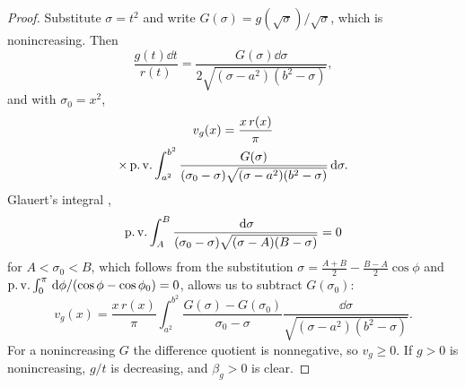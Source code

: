 \begin{proof}
Substitute $\sigma=t^2$ and write $G(\sigma)=g(\sqrt\sigma)/\sqrt\sigma$,
which is nonincreasing. Then
\[
\frac{g(t)\dd t}{r(t)}=\frac{G(\sigma)\dd\sigma}{2\sqrt{(\sigma-a^2)(b^2-\sigma)}},
\]
and with $\sigma_0=x^2$,
\begin{multline*}
v_g(x)=\frac{x\,r(x)}\pi\\
\times\operatorname{p.v.}\int_{a^2}^{b^2}\frac{G(\sigma)}{(\sigma_0-\sigma)
\sqrt{(\sigma-a^2)(b^2-\sigma)}}\,\mathrm d\sigma .
\end{multline*}
Glauert's integral \cite{king},
\[
\operatorname{p.v.}\int_{A}^{B}\frac{\,\mathrm d\sigma}{(\sigma_0-\sigma)\sqrt{(\sigma-A)(B-\sigma)}}=0
\]
for $A<\sigma_0<B$,
which follows from the substitution $\sigma=\frac{A+B}2-\frac{B-A}2\cos\phi$
and $\operatorname{p.v.}\int_0^\pi\,\mathrm d\phi/(\cos\phi-\cos\phi_0)=0$, allows us to subtract
$G(\sigma_0)$:
\[
v_g(x)=\frac{x\,r(x)}\pi\int_{a^2}^{b^2}\frac{G(\sigma)-G(\sigma_0)}{\sigma_0-\sigma}
\frac{\dd\sigma}{\sqrt{(\sigma-a^2)(b^2-\sigma)}} .
\]
For a nonincreasing $G$ the difference quotient is nonnegative, so
$v_g\ge0$. If $g>0$ is nonincreasing, $g/t$ is decreasing, and $\beta_g>0$
is clear.
\end{proof}
